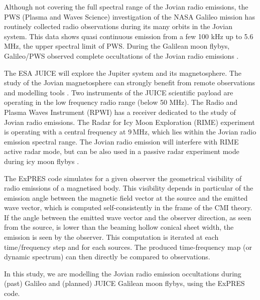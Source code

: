 \documentclass[referee]{aa}
\begin{document}
Although not covering the full spectral range of the Jovian radio emissions, the PWS (Plasma and Waves Science) investigation \citep{gurnett_SSR_92} of the NASA Galileo mission has routinely collected radio observations during its many orbits in the Jovian system. This data \citep{PWS_LPW_PDS} shows quasi continuous emission from a few 100 kHz up to 5.6 MHz, the upper spectral limit of PWS. During the Galilean moon flybys, Galileo/PWS observed complete occultations of the Jovian radio emissions \citep{Kurth:1997in}.

The ESA JUICE \citep[Jupiter Icy Moon Explorer,][]{2019EPSC...13..400W} will explore the Jupiter system and its magnetosphere. The study of the Jovian magnetosphere can strongly benefit from remote observations and modelling tools \citep{cecconi_baptiste_2019_2583611}. Two instruments of the JUICE scientific payload are operating in the low frequency radio range (below 50 MHz). The Radio and Plasma Waves Instrument (RPWI) has a receiver dedicated to the study of Jovian radio emissions. The Radar for Icy Moon Exploration (RIME) experiment \citep{Bruzzone:2013ge} is operating with a central frequency at 9\,MHz, which lies within the Jovian radio emission spectral range. The Jovian radio emission will interfere with RIME \citep{cecconi_PSS_11} active radar mode, but can be also used in a passive radar experiment mode during icy moon flybys \citep{RomeroWolf:2015fja,Schroeder:2016bu,2017pre8.conf..127K}.

The ExPRES code \citep[Exoplanetary and Planetary Radio Emissions Simulator,][]{Louis_AA_2019} simulates for a given observer the geometrical visibility of radio emissions of a magnetised body. This visibility depends in particular of the emission angle between the magnetic field vector at the source and the emitted wave vector, which is computed self-consistently in the frame of the CMI theory. If the angle between the emitted wave vector and the observer direction, as seen from the source, is lower than the beaming hollow conical sheet width, the emission is seen by the observer. This computation is iterated at each time/frequency step and for each sources. The produced time-frequency map (or dynamic spectrum) can then directly be compared to observations.

In this study, we are modelling the Jovian radio emission occultations during (past) Galileo and (planned) JUICE Galilean moon flybys, using the ExPRES code.  

\end{document}

